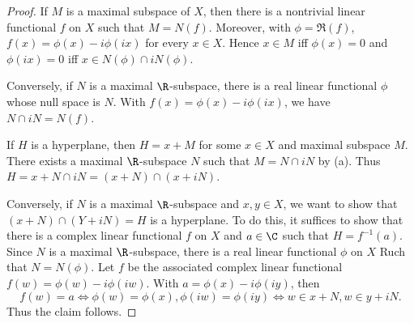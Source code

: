\begin{proof}
If $M$ is a maximal subspace of $X$, then there is a nontrivial linear functional $f$ on $X$ such that $M=N(f)$. Moreover, with $\phi=\Re(f)$, $f(x)=\phi(x)-i\phi(ix)$ for every $x\in X$. Hence $x\in M$ iff $\phi(x)=0$ and $\phi(ix)=0$ iff $x\in N(\phi)\cap iN(\phi)$.\par
Conversely, if $N$ is a maximal $\R$-subspace, there is a real linear functional $\phi$ whose null space is $N$. With $f(x)=\phi(x)-i\phi(ix)$, we have $N\cap iN=N(f)$.\par
If $H$ is a hyperplane, then $H=x+M$ for some $x\in X$ and maximal subspace $M$. There exists a maximal $\R$-subspace $N$ such that $M=N\cap iN$ by (a). Thus $H=x+N\cap iN=(x+N)\cap (x+iN)$.\par
Conversely, if $N$ is a maximal $\R$-subspace and $x,y\in X$, we want to show that $(x+N)\cap (Y+iN)=H$ is a hyperplane. To do this, it suffices to show that there is a complex linear functional $f$ on $X$ and $a\in\C$ such that $H=f^{-1}(a)$. Since $N$ is a maximal $\R$-subspace, there is a real linear functional $\phi$ on $X$ Ruch that $N=N(\phi)$. Let $f$ be the associated complex linear functional $f(w)=\phi(w)-i\phi(iw)$. With $a=\phi(x)-i\phi(iy)$, then
\[f(w)=a\iff \phi(w)=\phi(x),\phi(iw)=\phi(iy)\iff w\in x+N,w\in y+iN.\]
Thus the claim follows.
\end{proof}
